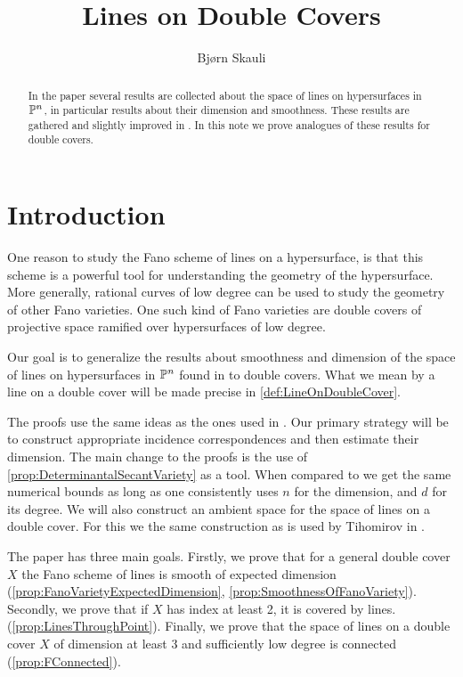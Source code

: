 \title{Lines on Double Covers}
\author{Bjørn Skauli}
\date{}

\maketitle
\label{pap:linesondoublecovers}
\begin{abstract}
In the paper \cite{BarthVandeVenFano} several results are collected about the space of lines on hypersurfaces in $\P^n$, in particular results about their dimension and smoothness. These results are gathered and slightly improved in  \cite[Section V.4]{KollarRationalCurves}. In this note we prove analogues of these results for double covers.
\end{abstract}

\section{Introduction}

One reason to study the Fano scheme of lines on a hypersurface, is that this scheme is a powerful tool for understanding the geometry of the hypersurface. More generally, rational curves of low degree can be used to study the geometry of other Fano varieties. One such kind of Fano varieties are double covers of projective space ramified over hypersurfaces of low degree.

Our goal is to generalize the results about smoothness and dimension of the space of lines on hypersurfaces in $\P^n$ found in \cite[Section V.4]{KollarRationalCurves} to double covers. What we mean by a line on a double cover will be made precise in \cref{def:LineOnDoubleCover}.

The proofs use the same ideas as the ones used in \cite[Section V.4]{KollarRationalCurves}. Our primary strategy will be to construct appropriate incidence correspondences and then estimate their dimension. The main change to the proofs is the use of \cref{prop:DeterminantalSecantVariety} as a tool. When compared to \cite[Theorem V.4.3]{KollarRationalCurves} we get the same numerical bounds as long as one consistently uses $n$ for the dimension, and $d$ for its degree.  We will also construct an ambient space for the space of lines on a double cover. For this we the same construction as is used by Tihomirov in \cite{TihFanoSurface}.

The paper has three main goals. Firstly, we prove that for a general double cover $X$ the Fano scheme of lines is smooth of expected dimension (\cref{prop:FanoVarietyExpectedDimension}, \cref{prop:SmoothnessOfFanoVariety}). Secondly, we prove that if $X$ has index at least 2, it is covered by lines. (\cref{prop:LinesThroughPoint}). Finally, we prove that the space of lines on a double cover $X$ of dimension at least 3 and sufficiently low degree is connected (\cref{prop:FConnected}).

